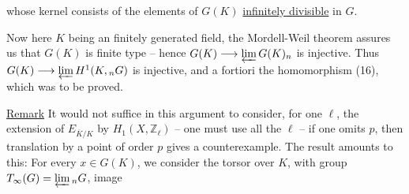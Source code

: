 whose kernel  consists of the elements of $G(K)$ \uline{infinitely divisible} in $G$.

Now here $K$ being an   finitely generated field, the Mordell-Weil theorem assures us that $G(K)$ is   finite type -- hence $G(K)\longrightarrow\varprojlim G(K)_n$ is injective. Thus $G(K)\longrightarrow\varprojlim H^1(K,{}_nG)$ is injective, and a fortiori the homomorphism (16), which was to be proved.

\uline{Remark} It would not suffice in this argument to consider, for one $\ell$, the extension of $E_{\overline K/K}$ by $H_1(X,\mathbb Z_\ell)$ -- one must use all the $\ell$ -- if one omits $p$, then translation by a point of order $p$ gives a counterexample.  The result amounts to this: For every $x\in G(K)$, we consider the torsor over $K$, with group $T_\infty(G)=\varprojlim {}_nG$, image
